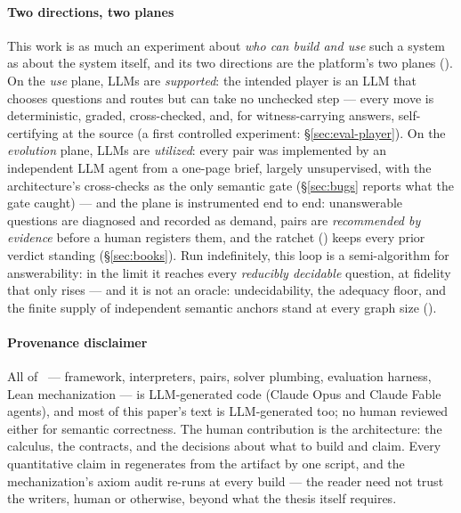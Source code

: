 \paragraph{Two directions, two planes}
This work is as much an experiment about \emph{who can build and use}
such a system as about the system itself, and its two directions are
the platform's two planes (). On the \emph{use} plane,
LLMs are \emph{supported}: the intended player is an LLM that chooses
questions and routes but can take no unchecked step --- every move is
deterministic, graded, cross-checked, and, for witness-carrying
answers, self-certifying at the source (a first controlled experiment:
\S\ref{sec:eval-player}). On the \emph{evolution} plane, LLMs are
\emph{utilized}: every pair was implemented by an independent LLM agent
from a one-page brief, largely unsupervised, with the architecture's
cross-checks as the only semantic gate (\S\ref{sec:bugs} reports what
the gate caught) --- and the plane is instrumented end to end:
unanswerable questions are diagnosed and recorded as demand, pairs are
\emph{recommended by evidence} before a human registers them, and the
ratchet () keeps every prior verdict standing
(\S\ref{sec:books}). Run indefinitely, this loop is a semi-algorithm
for answerability: in the limit it reaches every \emph{reducibly
decidable} question, at fidelity that only rises --- and it is not an
oracle: undecidability, the adequacy floor, and the finite supply of
independent semantic anchors stand at every graph size
().

\paragraph{Provenance disclaimer}
All of \hg\ --- framework, interpreters, pairs, solver plumbing,
evaluation harness, Lean mechanization --- is LLM-generated code
(Claude Opus and Claude Fable agents), and most of this paper's text is
LLM-generated too; no human reviewed either for semantic correctness.
The human contribution is the architecture: the calculus, the
contracts, and the decisions about what to build and claim. Every
quantitative claim in  regenerates from the
artifact by one script, and the mechanization's axiom audit re-runs at
every build --- the reader need not trust the writers, human or
otherwise, beyond what the thesis itself requires.

